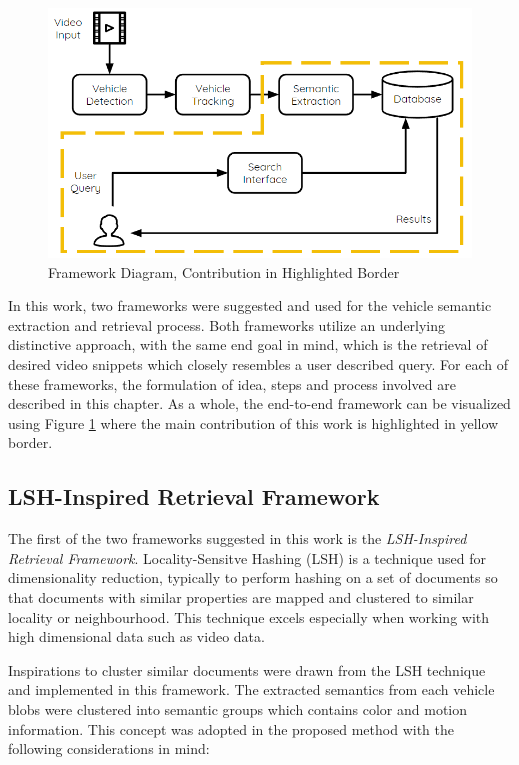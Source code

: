 \begin{figure}[hbt!]\centering
\includegraphics[width=.9\textwidth]{image/framework_new.PNG}
\caption{Framework Diagram, Contribution in Highlighted Border}
\label{fig:framework}
\end{figure}


In this work, two frameworks were suggested and used for the vehicle semantic extraction and retrieval process. Both frameworks utilize an underlying distinctive approach, with the same end goal in mind, which is the retrieval of desired video snippets which closely resembles a user described query. For each of these frameworks, the formulation of idea, steps and process involved are described in this chapter. 
As a whole, the end-to-end framework can be visualized using Figure \ref{fig:framework} where the main contribution of this work is highlighted in yellow border. 

\subsection{LSH-Inspired Retrieval Framework}
The first of the two frameworks suggested in this work is the \textit{LSH-Inspired Retrieval Framework}. Locality-Sensitve Hashing (LSH) is a technique used for dimensionality reduction, typically to perform hashing on a set of documents so that documents with similar properties are mapped and clustered to similar locality or neighbourhood. This technique excels especially when working with high dimensional data such as video data.

Inspirations to cluster similar documents were drawn from the LSH technique and implemented in this framework. The extracted semantics from each vehicle blobs were clustered into semantic groups which contains color and motion information. This concept was adopted in the proposed method with the following considerations in mind: 

